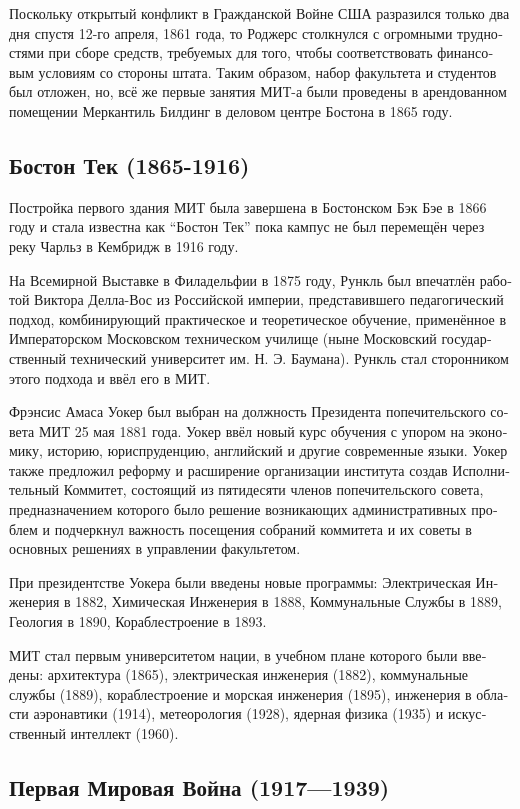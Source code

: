 \begin{russian}
Поскольку открытый конфликт в Гражданской Войне США разразился только два дня спустя 12-го апреля, 1861 года, то Роджерс столкнулся с огромными трудностями при сборе средств, требуемых для того, чтобы соответствовать финансовым условиям со стороны штата. Таким образом, набор факультета и студентов был отложен, но, всё же первые занятия МИТ-а были проведены в арендованном помещении Меркантиль Билдинг в деловом центре Бостона в 1865 году.

\subsection{Бостон Тек (1865-1916)}

Постройка первого здания МИТ была завершена в Бостонском Бэк Бэе в 1866 году и стала известна как ``Бостон Тек'' пока кампус не был перемещён через реку Чарльз в Кембридж в 1916 году.

На Всемирной Выставке в Филадельфии в 1875 году, Рункль был впечатлён работой Виктора Делла-Вос из Российской империи, представившего педагогический подход, комбинирующий практическое и теоретическое обучение, применённое в Императорском Московском техническом училище (ныне Московский государственный технический университет им. Н. Э. Баумана). Рункль стал сторонником этого подхода и ввёл его в МИТ.

Фрэнсис Амаса Уокер был выбран на должность Президента попечительского совета МИТ 25 мая 1881 года. Уокер ввёл новый курс обучения с упором на экономику, историю, юриспруденцию, английский и другие современные языки. Уокер также предложил реформу и расширение организации института создав Исполнительный Коммитет, состоящий из пятидесяти членов попечительского совета, предназначением которого было решение возникающих административных проблем и подчеркнул важность посещения собраний коммитета и их советы в основных решениях в управлении факультетом.

При президентстве Уокера были введены новые программы: Электрическая Инженерия в 1882, Химическая Инженерия в 1888, Коммунальные Службы в 1889, Геология в 1890, Кораблестроение в 1893.

МИТ стал первым университетом нации, в учебном плане которого были введены: архитектура (1865), электрическая инженерия (1882), коммунальные службы (1889), кораблестроение и морская инженерия (1895), инженерия в области аэронавтики (1914), метеорология (1928), ядерная физика (1935) и искусственный интеллект (1960).

\subsection{Первая Мировая Война (1917---1939)}


\end{russian}
